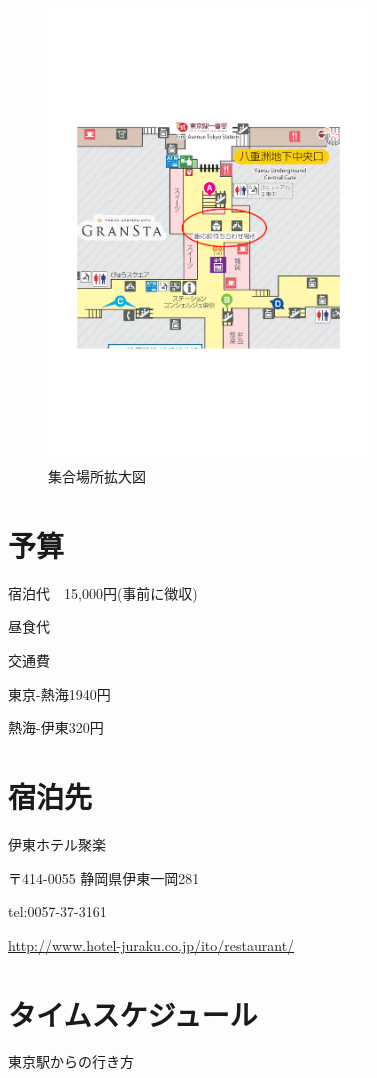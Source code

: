 \documentclass[a4j,11pt]{jsarticle}
\begin{document}
\begin{figure}[H]
\begin{center}
\includegraphics[mediaboxonly=/CropBox,width=85mm]{syuugoukakudai.pdf}
\end{center}
\caption{集合場所拡大図}
\label{fig:2}
\end{figure}

\section{予算} 
\label{sec:end} 
宿泊代　15,000円(事前に徴収)

昼食代

交通費

東京-熱海1940円

熱海-伊東320円

\section{宿泊先}
伊東ホテル聚楽

〒414-0055
静岡県伊東一岡281


tel:0057-37-3161

\url{http://www.hotel-juraku.co.jp/ito/restaurant/}
\section{タイムスケジュール}
東京駅からの行き方
\end{document}
